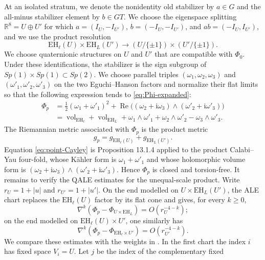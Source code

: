 \documentclass[11pt]{article}
\theoremstyle{remark}\newtheorem{remark}[theorem]{Remark}
\newcommand{\ii}{\mathrm i}
\newcommand{\EH}{\mathrm{EH}}
\newcommand{\R}{\mathbb R}
\begin{document}
At an isolated stratum, we denote the nonidentity old stabilizer by
$a\in G$ and the all-minus stabilizer element by $b\in GT$.  We choose the
eigenspace splitting $\R^8=U\oplus U'$ for which
$a=(I_U,-I_{U'})$, $b=(-I_U,-I_{U'})$, and
$ab=(-I_U,I_{U'})$, and we use the product resolution
\begin{equation}\label{eq:EH-product}
\EH_\ell(U)\times\EH_L(U')\longrightarrow
(U/\{\pm1\})\times(U'/\{\pm1\}).
\end{equation}
We choose quaternionic structures on $U$ and $U'$ that are compatible with
$\Phi_0$.  Under these identifications, the stabilizer is the sign subgroup
of $Sp(1)\times Sp(1)\subset Sp(2)$.  We choose parallel triples
$(\omega_1,\omega_2,\omega_3)$ and
$(\omega'_1,\omega'_2,\omega'_3)$ on the two Eguchi--Hanson factors and
normalize their flat limits so that the following expression tends to
\eqref{eq:Phi-expanded}:
\begin{equation}\label{eq:point-Cayley}
\begin{split}
 \Phi_p
 &=\tfrac12(\omega_1+\omega'_1)^2
   +\operatorname{Re}\bigl((\omega_2+\ii\omega_3)
                      \wedge(\omega'_2+\ii\omega'_3)\bigr)\\
 &=\operatorname{vol}_{\EH_\ell}+\operatorname{vol}_{\EH_L}
   +\omega_1\wedge\omega'_1+
    \omega_2\wedge\omega'_2-\omega_3\wedge\omega'_3.
\end{split}
\end{equation}
The Riemannian metric associated with $\Phi_p$ is the product metric
\begin{equation}\label{eq:point-metric}
 g_p=g_{\EH_\ell(U)}+g_{\EH_L(U')}.
\end{equation}
Equation \eqref{eq:point-Cayley} is Proposition 13.1.4 applied to the
product Calabi--Yau four-fold,
whose K\"ahler form is $\omega_1+\omega'_1$ and whose holomorphic volume
form is $(\omega_2+\ii\omega_3)\wedge
(\omega'_2+\ii\omega'_3)$.  Hence $\Phi_p$ is closed and torsion-free.
It remains to verify the QALE estimates for the unequal-scale product.
Write $r_U=1+|u|$ and $r_{U'}=1+|u'|$.  On the end modelled on
$U\times\EH_L(U')$, the ALE chart replaces the $\EH_\ell(U)$ factor by
its flat cone and gives, for every $k\geq0$,
\[
 \nabla^k(\Phi_p-\Phi_{U\times\EH_L})=O(r_U^{-4-k});
\]
on the end modelled on $\EH_\ell(U)\times U'$, one similarly has
\[
 \nabla^k(\Phi_p-\Phi_{\EH_\ell\times U'})=O(r_{U'}^{-4-k}).
\]
We compare these estimates with the weights in
\cite[Definition 13.1.8]{JoyceBook}.  In the first chart the index $i$
has fixed space $V_i=U$.  Let $j$ be the index of the complementary fixed
\end{document}
